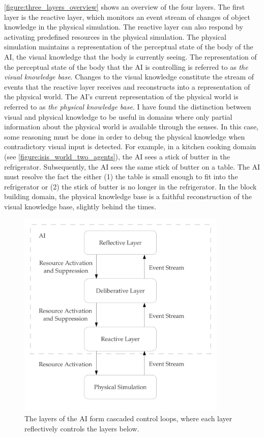 {\mbox{\autoref{figure:three_layers_overview}}} shows an overview of
the four layers.  The first layer is the reactive layer, which
monitors an event stream of changes of object knowledge in the
physical simulation.  The reactive layer can also respond by
activating predefined resources in the physical simulation.  The
physical simulation maintains a representation of the perceptual state
of the body of the AI, the visual knowledge that the body is currently
seeing.  The representation of the perceptual state of the body that
the AI is controlling is referred to as \emph{the visual knowledge
  base}.  Changes to the visual knowledge constitute the stream of
events that the reactive layer receives and reconstructs into a
representation of the physical world.  The AI's current representation
of the physical world is referred to as \emph{the physical knowledge
  base}.  I have found the distinction between visual and physical
knowledge to be useful in domains where only partial information about
the physical world is available through the senses.  In this case,
some reasoning must be done in order to debug the physical knowledge
when contradictory visual input is detected.  For example, in a
kitchen cooking domain (see
{\mbox{\autoref{figure:isis_world_two_agents}}}), the AI sees a stick
of butter in the refrigerator.  Subsequently, the AI sees the same
stick of butter on a table.  The AI must resolve the fact the either
(1) the table is small enough to fit into the refrigerator or (2) the
stick of butter is no longer in the refrigerator.  In the block
building domain, the physical knowledge base is a faithful
reconstruction of the visual knowledge base, slightly behind the
times.
\begin{figure}
\begin{center}
\includegraphics[width=10cm]{gfx/three_layers_overview}
\end{center}
\caption[The layers of the AI.]{The layers of the AI form cascaded
  control loops, where each layer reflectively controls the layers
  below.}
\label{figure:three_layers_overview}
\end{figure}
